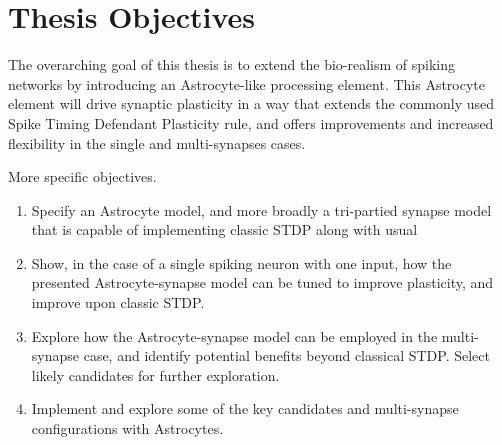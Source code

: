    \section{Thesis Objectives}
    The overarching goal of this thesis is to extend the bio-realism of spiking
    networks by introducing an Astrocyte-like processing element. This Astrocyte
    element will drive synaptic plasticity in a way that extends the commonly
    used Spike Timing Defendant Plasticity rule, and offers improvements and
    increased flexibility in the single and multi-synapses cases.

    More specific objectives.
    \begin{enumerate}
        \item Specify an Astrocyte model, and more broadly a tri-partied synapse
          model that is capable of implementing classic STDP along with usual 

        \item Show, in the case of a single spiking neuron with one input, how
          the presented Astrocyte-synapse model can be tuned to improve
          plasticity, and improve upon classic STDP.

        \item Explore how the Astrocyte-synapse model can be employed in the
          multi-synapse case, and identify potential benefits beyond classical
          STDP. Select likely candidates for further exploration.

        \item Implement and explore some of the key candidates and multi-synapse
          configurations with Astrocytes.
          
    \end{enumerate}
